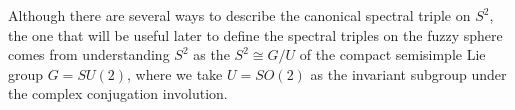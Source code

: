     



Although there are several ways to describe the canonical spectral triple on $S^2$, the one that will be useful later to define the spectral triples on the fuzzy sphere comes from understanding $S^2$ as the  $S^2 \cong G/U$ of the compact semisimple Lie group $G = SU(2)$, where we take $U = SO(2)$ as the invariant subgroup under the complex conjugation involution.

